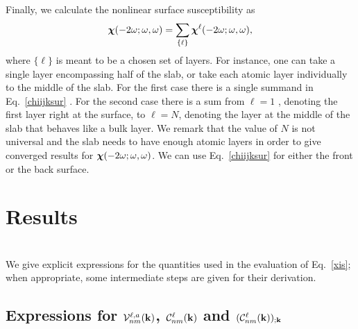 \documentclass[floatfix,prb,aps,superscriptaddress,11pt,preprint,letterpaper]{revtex4}
\begin{document}
Finally, we calculate the nonlinear surface susceptibility as 
\begin{equation}\label{chiijksur}
\boldsymbol{\chi}(-2\omega;\omega,\omega)
= \sum_{\{\ell\}}\boldsymbol{\chi}^{\ell}(-2\omega;\omega,\omega),
\end{equation} 
where $\{\ell\}$
is meant to be {\color{red} a chosen set of layers.} For instance, 
one {\color{red} can take a single layer 
encompassing} half of the slab, or {\color{red} take each 
atomic layer individually to the middle} 
of the slab. {\color{red} For} the first case there is 
{\color{red} a} single summand
in Eq.~\eqref{chiijksur}{\color{red} . For the second case
there is} a sum from $\ell=1${\color{red} , denoting the first layer 
right at the surface, to $\ell=N$, denoting the layer at the middle of the slab 
that behaves like a bulk layer.}
We {\color{red} remark} that the value of 
$N$ is not universal {\color{red} and} 
the slab needs to have enough atomic layers 
{\color{red} in} order to give converged results for 
$\boldsymbol{\chi} (-2\omega;\omega,\omega)$. 
We can use Eq.~\eqref{chiijksur} for 
either the front or the back surface. 

\section{Results}



\appendix 
\section{}\label{appe}
We give explicit expressions for the quantities used in the evaluation 
of Eq.~\eqref{xis}; when appropriate, some 
intermediate steps are given for their derivation. 
\subsection{ Expressions for 
\texorpdfstring{${\cal V}^{\ell,a}_{nm}(\mathbf{k})$, 
${\cal C}^{\ell}_{nm}(\mathbf{k})$ 
and
$({\cal C}^{\ell}_{nm}(\mathbf{k}))_{;\mathbf{k}}$
}{Vnm and Cnm}}\label{calpcalc}
\end{document}
